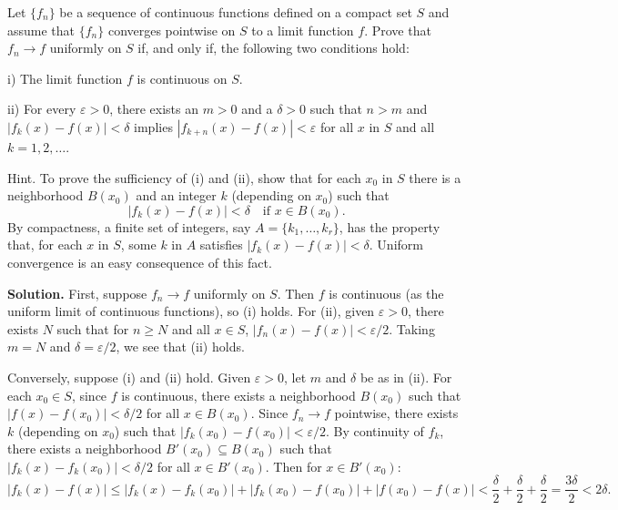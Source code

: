 \begin{problembox}
Let \( \{f_n\} \) be a sequence of continuous functions defined on a compact set \( S \) and assume that \( \{f_n\} \) converges pointwise on \( S \) to a limit function \( f \). Prove that \( f_n \to f \) uniformly on \( S \) if, and only if, the following two conditions hold:

i) The limit function \( f \) is continuous on \( S \).

ii) For every \( \varepsilon > 0 \), there exists an \( m > 0 \) and a \( \delta > 0 \) such that \( n > m \) and \( |f_k(x) - f(x)| < \delta \) implies \( |f_{k+n}(x) - f(x)| < \varepsilon \) for all \( x \) in \( S \) and all \( k = 1, 2, \ldots \).

Hint. To prove the sufficiency of (i) and (ii), show that for each \( x_0 \) in \( S \) there is a neighborhood \( B(x_0) \) and an integer \( k \) (depending on \( x_0 \)) such that
\[|f_k(x) - f(x)| < \delta \quad \text{if } x \in B(x_0).\]
By compactness, a finite set of integers, say \( A = \{k_1, \ldots, k_r\} \), has the property that, for each \( x \) in \( S \), some \( k \) in \( A \) satisfies \( |f_k(x) - f(x)| < \delta \). Uniform convergence is an easy consequence of this fact.
\end{problembox}

\noindent\textbf{Solution.} First, suppose \( f_n \to f \) uniformly on \( S \). Then \( f \) is continuous (as the uniform limit of continuous functions), so (i) holds. For (ii), given \( \varepsilon > 0 \), there exists \( N \) such that for \( n \geq N \) and all \( x \in S \), \( |f_n(x) - f(x)| < \varepsilon/2 \). Taking \( m = N \) and \( \delta = \varepsilon/2 \), we see that (ii) holds.

Conversely, suppose (i) and (ii) hold. Given \( \varepsilon > 0 \), let \( m \) and \( \delta \) be as in (ii). For each \( x_0 \in S \), since \( f \) is continuous, there exists a neighborhood \( B(x_0) \) such that \( |f(x) - f(x_0)| < \delta/2 \) for all \( x \in B(x_0) \). Since \( f_n \to f \) pointwise, there exists \( k \) (depending on \( x_0 \)) such that \( |f_k(x_0) - f(x_0)| < \varepsilon/2 \). By continuity of \( f_k \), there exists a neighborhood \( B'(x_0) \subseteq B(x_0) \) such that \( |f_k(x) - f_k(x_0)| < \delta/2 \) for all \( x \in B'(x_0) \). Then for \( x \in B'(x_0) \):
\[|f_k(x) - f(x)| \leq |f_k(x) - f_k(x_0)| + |f_k(x_0) - f(x_0)| + |f(x_0) - f(x)| < \frac{\delta}{2} + \frac{\delta}{2} + \frac{\delta}{2} = \frac{3\delta}{2} < 2\delta.\]


